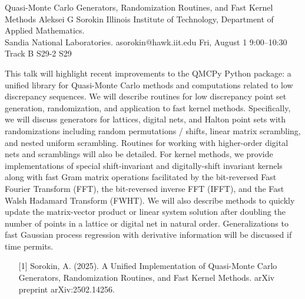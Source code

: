 \begin{talk}
  {Quasi-Monte Carlo Generators, Randomization Routines, and Fast Kernel Methods}%
  {Aleksei G Sorokin}%
  {Illinois Institute of Technology, Department of Applied Mathematics. \\ Sandia National Laboratories.}%
  {asorokin@hawk.iit.edu}%
  {}%
  {}%
  {Fri, August 1 9:00–10:30 Track B}%
  {S29-2}%
  {S29}%
  
				
			
        This talk will highlight recent improvements to the QMCPy Python package: a unified library for Quasi-Monte Carlo methods and computations related to low discrepancy sequences. We will describe routines for low discrepancy point set generation, randomization, and application to fast kernel methods. Specifically, we will discuss generators for lattices, digital nets, and Halton point sets with randomizations including random permutations / shifts, linear matrix scrambling, and nested uniform scrambling. Routines for working with higher-order digital nets and scramblings will also be detailed. For kernel methods, we provide implementations of special shift-invariant and digitally-shift invariant kernels along with fast Gram matrix operations facilitated by the bit-reversed Fast Fourier Transform (FFT), the bit-reversed inverse FFT (IFFT), and the Fast Walsh Hadamard Transform (FWHT). We will also describe methods to quickly update the matrix-vector product or linear system solution after doubling the number of points in a lattice or digital net in natural order. Generalizations to fast Gaussian process regression with derivative information will be discussed if time permits. 
\medskip

\begin{enumerate}
	\item[{[1]}] Sorokin, A. (2025). A Unified Implementation of Quasi-Monte Carlo Generators, Randomization Routines, and Fast Kernel Methods. arXiv preprint arXiv:2502.14256.
\end{enumerate}

\end{talk}

